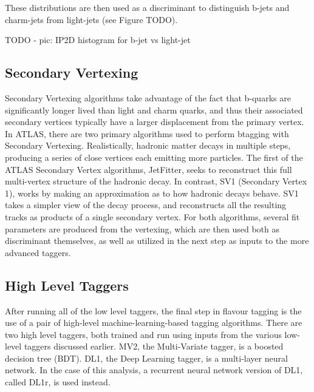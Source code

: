             These distributions are then used as a discriminant to distinguish b-jets and charm-jets from light-jets
                (see Figure TODO)\cite{thesis_giacinto}. %

            TODO - pic: IP2D histogram for b-jet vs light-jet

        \subsection{Secondary Vertexing}

            Secondary Vertexing algorithms take advantage of the fact that b-quarks are significantly longer lived than light and charm quarks,
                and thus their associated secondary vertices typically have a larger displacement from the primary vertex.
            In ATLAS, there are two primary algorithms used to perform btagging with Secondary Vertexing.
            Realistically, hadronic matter decays in multiple steps, producing a series of close vertices each emitting more particles.
            The first of the ATLAS Secondary Vertex algorithms, JetFitter, seeks to reconstruct this full multi-vertex structure of the hadronic decay.
            In contrast, SV1 (Secondary Vertex 1), works by making an approximation as to how hadronic decays behave.
            SV1 takes a simpler view of the decay process, and reconstructs all the resulting tracks as products of a single secondary vertex.
            For both algorithms, several fit parameters are produced from the vertexing,
                which are then used both as discriminant themselves,
                as well as utilized in the next step as inputs to the more advanced taggers\cite{btagging_optimisation}.

        \subsection{High Level Taggers}

            After running all of the low level taggers,
                the final step in flavour tagging is the use of a pair of high-level machine-learning-based tagging algorithms.
            There are two high level taggers, both trained and run using inputs from the various low-level taggers discussed earlier.
            MV2, the Multi-Variate tagger, is a boosted decision tree (BDT).
            DL1, the Deep Learning tagger, is a multi-layer neural network.
            In the case of this analysis, a recurrent neural network version of DL1, called DL1r, is used instead.
            \cite{bjet_id_and_performance}
            \cite{btagging_optimisation}

